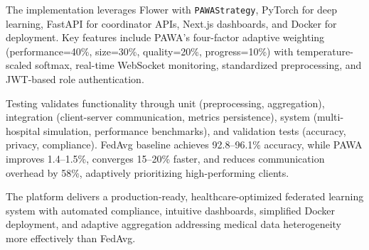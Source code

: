 The implementation leverages Flower with \texttt{PAWAStrategy}, PyTorch for deep learning, FastAPI for coordinator APIs, Next.js dashboards, and Docker for deployment. Key features include PAWA’s four-factor adaptive weighting (performance=40\%, size=30\%, quality=20\%, progress=10\%) with temperature-scaled softmax, real-time WebSocket monitoring, standardized preprocessing, and JWT-based role authentication.

Testing validates functionality through unit (preprocessing, aggregation), integration (client-server communication, metrics persistence), system (multi-hospital simulation, performance benchmarks), and validation tests (accuracy, privacy, compliance). FedAvg baseline achieves 92.8–96.1\% accuracy, while PAWA improves 1.4–1.5\%, converges 15–20\% faster, and reduces communication overhead by 58\%, adaptively prioritizing high-performing clients.

The platform delivers a production-ready, healthcare-optimized federated learning system with automated compliance, intuitive dashboards, simplified Docker deployment, and adaptive aggregation addressing medical data heterogeneity more effectively than FedAvg.



